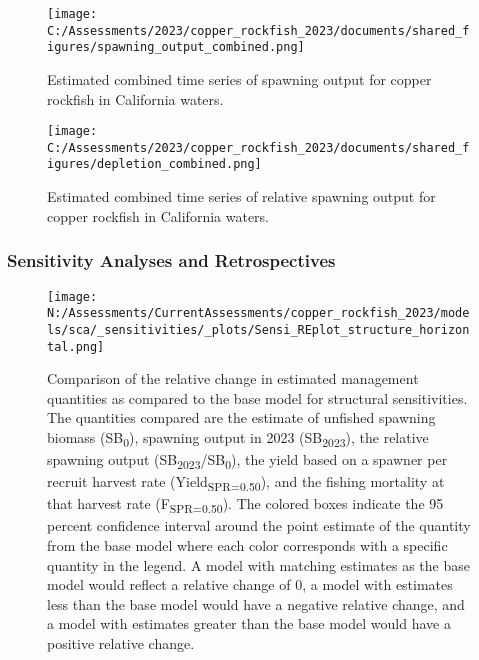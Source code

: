 \documentclass[11pt,
  english,
  letterpaper,
]{article}
\begin{document}
\pagebreak

\begin{figure}
\centering
\texttt{[image: C:/Assessments/2023/copper\_rockfish\_2023/documents/shared\_figures/spawning\_output\_combined.png]}
\caption{Estimated combined time series of spawning output for copper rockfish in California waters.\label{fig:sb-all}}
\end{figure}

\clearpage

\begin{figure}
\centering
\texttt{[image: C:/Assessments/2023/copper\_rockfish\_2023/documents/shared\_figures/depletion\_combined.png]}
\caption{Estimated combined time series of relative spawning output for copper rockfish in California waters.\label{fig:depl-all}}
\end{figure}

\clearpage

\hypertarget{sensitivity-analyses-and-retrospectives}{%
\subsubsection{Sensitivity Analyses and Retrospectives}\label{sensitivity-analyses-and-retrospectives}}

\begin{figure}
\centering
\texttt{[image: N:/Assessments/CurrentAssessments/copper\_rockfish\_2023/models/sca/\_sensitivities/\_plots/Sensi\_REplot\_structure\_horizontal.png]}
\caption{Comparison of the relative change in estimated management quantities as compared to the base model for structural sensitivities. The quantities compared are the estimate of unfished spawning biomass (SB\textsubscript{0}), spawning output in 2023 (SB\textsubscript{2023}), the relative spawning output (SB\textsubscript{2023}/SB\textsubscript{0}), the yield based on a spawner per recruit harvest rate (Yield\textsubscript{SPR=0.50}), and the fishing mortality at that harvest rate (F\textsubscript{SPR=0.50}). The colored boxes indicate the 95 percent confidence interval around the point estimate of the quantity from the base model where each color corresponds with a specific quantity in the legend. A model with matching estimates as the base model would reflect a relative change of 0, a model with estimates less than the base model would have a negative relative change, and a model with estimates greater than the base model would have a positive relative change.\label{fig:sens-structure}}
\end{figure}
\end{document}
